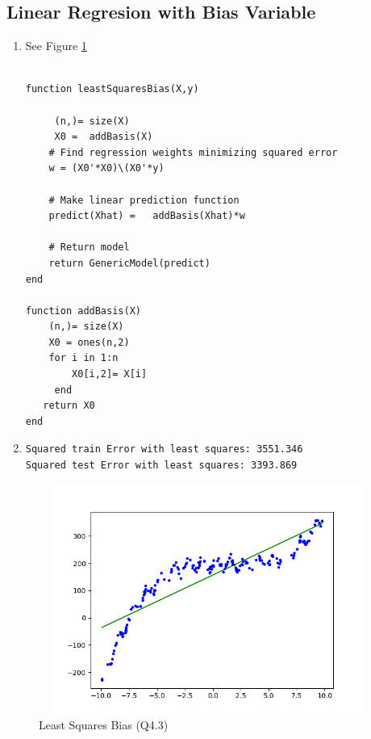 \documentclass{article}
\begin{document}

\subsection{Linear Regresion with Bias Variable}

\begin{enumerate}


\item See Figure \ref{fig:q4_3}
\begin{verbatim}

function leastSquaresBias(X,y)

     (n,)= size(X)
     X0 =  addBasis(X)
    # Find regression weights minimizing squared error
    w = (X0'*X0)\(X0'*y)

    # Make linear prediction function
    predict(Xhat) =   addBasis(Xhat)*w

    # Return model
    return GenericModel(predict)
end

function addBasis(X)
    (n,)= size(X)
    X0 = ones(n,2)
    for i in 1:n
        X0[i,2]= X[i]
     end 
   return X0
end 

 \end{verbatim}

\item
 \begin{verbatim}
Squared train Error with least squares: 3551.346
Squared test Error with least squares: 3393.869
 \end{verbatim}


\end{enumerate}


\begin{figure}[h!]
    \includegraphics[width=30em,height=7.5cm]{a2_q4_3.png}
    \caption{Least Squares Bias (Q4.3)}
    \label{fig:q4_3}
  \end{figure}
\end{document}
